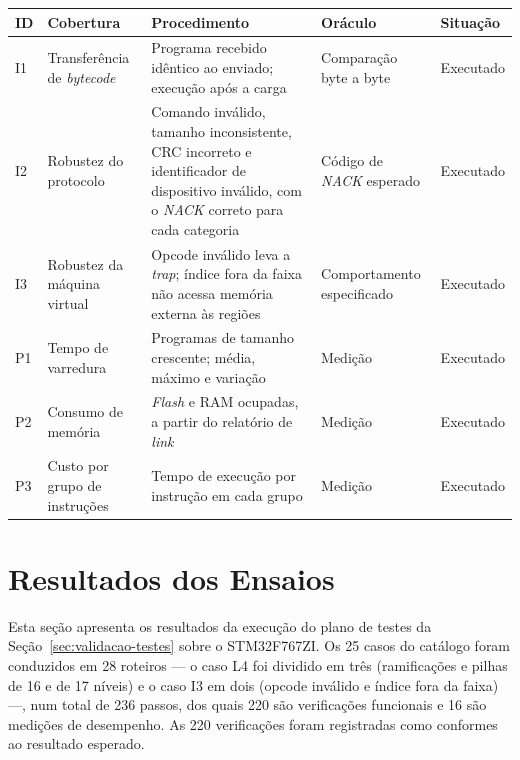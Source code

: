 \begin{quadrofixo}
    \centering
    \small\singlespacing
    \begin{tabular}{|p{0.8cm}|p{3.2cm}|p{4.8cm}|p{2.8cm}|p{2.3cm}|}
        \hline
        ID & Cobertura & Procedimento & Oráculo & Situação \\
        \hline
        I1 & Transferência de \textit{bytecode} & Programa recebido idêntico ao enviado; execução após a carga & Comparação byte a byte & Executado \\
        \hline
        I2 & Robustez do protocolo & Comando inválido, tamanho inconsistente, CRC incorreto e identificador de dispositivo inválido, com o \textit{NACK} correto para cada categoria & Código de \textit{NACK} esperado & Executado \\
        \hline
        I3 & Robustez da máquina virtual & Opcode inválido leva a \textit{trap}; índice fora da faixa não acessa memória externa às regiões & Comportamento especificado & Executado \\
        \hline
        P1 & Tempo de varredura & Programas de tamanho crescente; média, máximo e variação & Medição & Executado \\
        \hline
        P2 & Consumo de memória & \textit{Flash} e RAM ocupadas, a partir do relatório de \textit{link} & Medição & Executado \\
        \hline
        P3 & Custo por grupo de instruções & Tempo de execução por instrução em cada grupo & Medição & Executado \\
        \hline
    \end{tabular}
    \label{qua:testes-integracao}
\end{quadrofixo}


\section{Resultados dos Ensaios}
\label{sec:resultados-ensaios}

Esta seção apresenta os resultados da execução do plano de testes da Seção~\ref{sec:validacao-testes} sobre o STM32F767ZI.
Os 25 casos do catálogo foram conduzidos em 28 roteiros --- o caso L4 foi dividido em três (ramificações e pilhas de 16 e de 17 níveis) e o caso I3 em dois (opcode inválido e índice fora da faixa) ---, num total de 236 passos, dos quais 220 são verificações funcionais e 16 são medições de desempenho.
As 220 verificações foram registradas como conformes ao resultado esperado.

